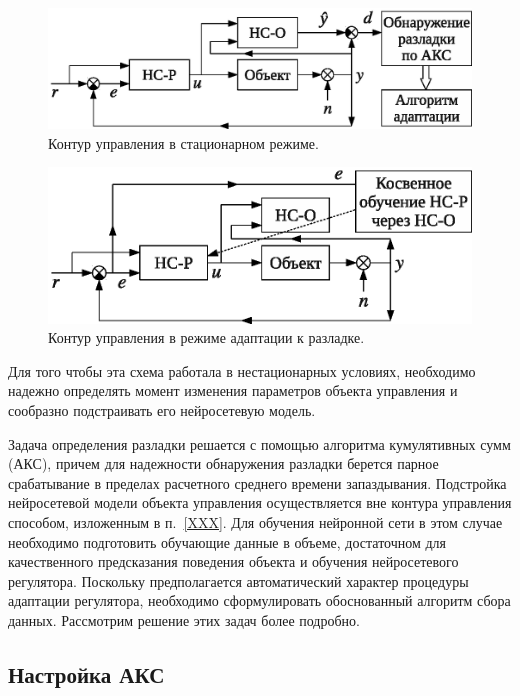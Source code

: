 \begin{figure}[h]
\centering
\includegraphics{steady_state_rus}
\caption{Контур управления в стационарном режиме.}
\label{fig:steady_state_loop}
\end{figure}

\begin{figure}[h]
\centering
\includegraphics{modified_adoption_rus}
\caption{Контур управления в режиме адаптации к разладке.}
\label{fig:permanent_adoption_loop}
\end{figure}

Для того чтобы эта схема работала в нестационарных условиях,
необходимо надежно определять момент изменения параметров объекта
управления и сообразно подстраивать его нейросетевую модель.

Задача определения разладки решается с помощью алгоритма кумулятивных
сумм (АКС), причем для надежности обнаружения разладки берется парное
срабатывание в пределах расчетного среднего времени запаздывания.
Подстройка нейросетевой модели объекта управления осуществляется вне
контура управления способом, изложенным в п.~\ref{XXX}.  Для обучения
нейронной сети в этом случае необходимо подготовить обучающие данные в
объеме, достаточном для качественного предсказания поведения объекта и
обучения нейросетевого регулятора.  Поскольку предполагается
автоматический характер процедуры адаптации регулятора, необходимо
сформулировать обоснованный алгоритм сбора данных.  Рассмотрим решение
этих задач более подробно.

\subsection{Настройка АКС}

